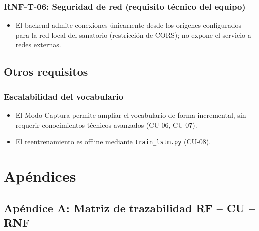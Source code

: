 \subsubsection{RNF-T-06: Seguridad de red (requisito técnico del equipo)}
\begin{itemize}
    \item El backend admite conexiones únicamente desde los orígenes configurados para la red local del sanatorio (restricción de CORS); no expone el servicio a redes externas.
\end{itemize}

\subsection{Otros requisitos}

\subsubsection{Escalabilidad del vocabulario}
\begin{itemize}
    \item El Modo Captura permite ampliar el vocabulario de forma incremental, sin requerir conocimientos técnicos avanzados (CU-06, CU-07).
    \item El reentrenamiento es offline mediante \texttt{train\_lstm.py} (CU-08).
\end{itemize}

\section{Apéndices}

\subsection{Apéndice A: Matriz de trazabilidad RF -- CU -- RNF}

